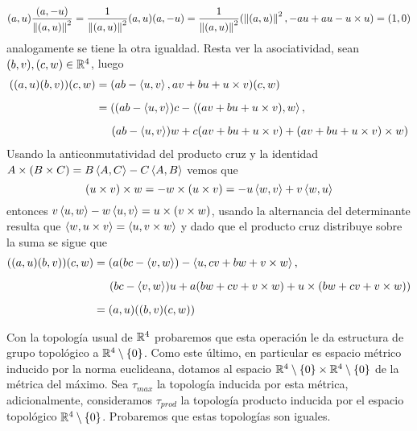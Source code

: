 \documentclass{article}
\begin{document}
\begin{equation*}
    (a,u)\frac{(a,-u)}{\left \lVert (a,u)\right \rVert^{2}}=\frac{1}{\left \lVert (a,u)\right \rVert^{2}}(a,u)(a,-u)
    =\frac{1}{\left \lVert (a,u)\right \rVert^{2}}(\left \lVert (a,u)\right \rVert^{2},-au+au-u\times u)=(1,0)
\end{equation*}
analogamente se tiene la otra igualdad. Resta ver la asociatividad, sean $(b,v),(c,w)\in\mathbb{R}^{4}$, 
luego
\begin{align*}
    ((a,u)(b,v))(c,w) &= (ab-\left\langle{u},{v}\right\rangle,av+bu+u\times v)(c,w) \\[2mm]
    &= ((ab-\left\langle{u},{v}\right\rangle)c-\left\langle{(av+bu+u\times v)},{w}\right\rangle, \\[2mm]
    &\hspace{5mm}(ab-\left\langle{u},{v}\right\rangle)w+c(av+bu+u\times v)+(av+bu+u\times v)\times w)
\end{align*}
Usando la anticonmutatividad del producto cruz y la identidad $A\times(B\times C)
=B\left\langle{A},{C}\right\rangle-C\left\langle{A},{B}\right\rangle$ vemos que
\begin{equation*}
    (u\times v)\times w=-w\times(u\times v)=-u\left\langle{w},{v}\right\rangle+v\left\langle{w},{u}\right\rangle
\end{equation*}
entonces $v\left\langle{u},{w}\right\rangle-w\left\langle{u},{v}\right\rangle=u\times(v\times w)$, usando la alternancia del determinante 
resulta que $\left\langle{w},{u\times v}\right\rangle=\left\langle{u},{v\times w}\right\rangle$ y dado que el producto cruz distribuye sobre la
suma se sigue que
\begin{align*}
    ((a,u)(b,v))(c,w) &= (a(bc-\left\langle{v},{w}\right\rangle)-\left\langle{u},{cv+bw+v\times w}\right\rangle, \\[2mm]
    &\hspace{5mm}(bc-\left\langle{v},{w}\right\rangle)u+a(bw+cv+v\times w)+u\times(bw+cv+v\times w)) \\[2mm]
    &= (a,u)((b,v)(c,w))
\end{align*}

\noindent Con la topología usual de $\mathbb{R}^{4}$ probaremos que esta operación le da estructura de 
grupo topológico a $\mathbb{R}^{4}\setminus\{0\}$. Como este último, en particular es espacio métrico
inducido por la norma euclideana, dotamos al espacio 
$\mathbb{R}^{4}\setminus\{0\}\times\mathbb{R}^{4}\setminus\{0\}$ de la métrica del máximo. Sea $\tau_{max}$ la 
topología inducida por esta métrica, adicionalmente, consideramos $\tau_{prod}$ la topología 
producto inducida por el espacio topológico $\mathbb{R}^{4}\setminus\{0\}$. Probaremos que estas 
topologías son iguales.
\end{document}
